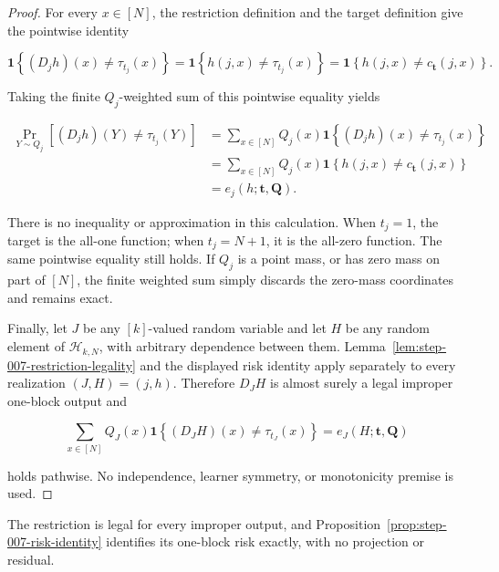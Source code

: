 \begin{proof}
For every \(x\in[N]\), the restriction definition and the target definition
give the pointwise identity

\[
  \mathbf1\!\left\{(D_jh)(x)\ne\tau_{t_j}(x)\right\}
  =\mathbf1\!\left\{h(j,x)\ne\tau_{t_j}(x)\right\}
  =\mathbf1\!\left\{h(j,x)\ne c_{\boldsymbol t}(j,x)\right\}.
\]

Taking the finite \(Q_j\)-weighted sum of this pointwise equality yields

\[
\begin{aligned}
  \Pr_{Y\sim Q_j}\!\left[(D_jh)(Y)\ne\tau_{t_j}(Y)\right]
  &=\sum_{x\in[N]}Q_j(x)
       \mathbf1\!\left\{(D_jh)(x)\ne\tau_{t_j}(x)\right\}\\
  &=\sum_{x\in[N]}Q_j(x)
       \mathbf1\!\left\{h(j,x)\ne c_{\boldsymbol t}(j,x)\right\}\\
  &=e_j(h;\boldsymbol t,\boldsymbol Q).
\end{aligned}
\]

There is no inequality or approximation in this calculation. When
\(t_j=1\), the target is the all-one function; when \(t_j=N+1\), it is the
all-zero function. The same pointwise equality still holds. If \(Q_j\) is a
point mass, or has zero mass on part of \([N]\), the finite weighted sum
simply discards the zero-mass coordinates and remains exact.

Finally, let \(J\) be any \([k]\)-valued random variable and let \(H\) be any
random element of \(\mathcal H_{k,N}\), with arbitrary dependence between
them. Lemma~\ref{lem:step-007-restriction-legality} and the displayed risk
identity apply separately to every realization \((J,H)=(j,h)\). Therefore
\(D_JH\) is almost surely a legal improper one-block output and

\[
  \sum_{x\in[N]}Q_J(x)
    \mathbf1\!\left\{(D_JH)(x)\ne\tau_{t_J}(x)\right\}
  =e_J(H;\boldsymbol t,\boldsymbol Q)
\]

holds pathwise. No independence, learner symmetry, or monotonicity premise
is used. \end{proof}
The restriction is legal for every improper output, and
Proposition~\ref{prop:step-007-risk-identity} identifies its one-block risk
exactly, with no projection or residual.

